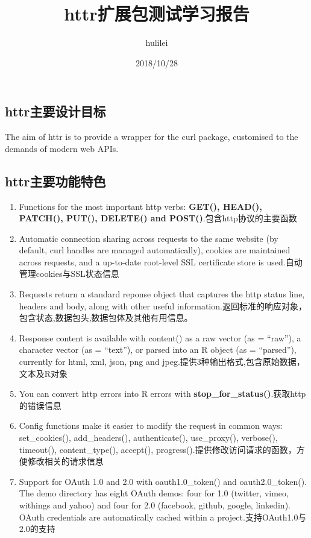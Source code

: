 \documentclass[]{article}
\title{httr扩展包测试学习报告}
\author{hulilei}
\date{2018/10/28}
\providecommand{\tightlist}{%
  \setlength{\itemsep}{0pt}\setlength{\parskip}{0pt}}
\begin{document}
\maketitle

\subsection{httr主要设计目标}\label{httr}

The aim of httr is to provide a wrapper for the curl package, customised
to the demands of modern web APIs.

\subsection{httr主要功能特色}\label{httr}

\begin{enumerate}
\def\labelenumi{\arabic{enumi}.}
\tightlist
\item
  Functions for the most important http verbs: \textbf{GET(), HEAD(),
  PATCH(), PUT(), DELETE() and POST()}.包含http协议的主要函数
\item
  Automatic connection sharing across requests to the same website (by
  default, curl handles are managed automatically), cookies are
  maintained across requests, and a up-to-date root-level SSL
  certificate store is used.自动管理cookies与SSL状态信息
\item
  Requests return a standard reponse object that captures the http
  status line, headers and body, along with other useful
  information.返回标准的响应对象，包含状态,数据包头,数据包体及其他有用信息。
\item
  Response content is available with content() as a raw vector (as =
  ``raw''), a character vector (as = ``text''), or parsed into an R
  object (as = ``parsed''), currently for html, xml, json, png and
  jpeg.提供3种输出格式,包含原始数据，文本及R对象
\item
  You can convert http errors into R errors with
  \textbf{stop\_for\_status()}.获取http的错误信息
\item
  Config functions make it easier to modify the request in common ways:
  set\_cookies(), add\_headers(), authenticate(), use\_proxy(),
  verbose(), timeout(), content\_type(), accept(),
  progress().提供修改访问请求的函数，方便修改相关的请求信息
\item
  Support for OAuth 1.0 and 2.0 with oauth1.0\_token() and
  oauth2.0\_token(). The demo directory has eight OAuth demos: four for
  1.0 (twitter, vimeo, withings and yahoo) and four for 2.0 (facebook,
  github, google, linkedin). OAuth credentials are automatically cached
  within a project.支持OAuth1.0与2.0的支持
\end{enumerate}
\end{document}
